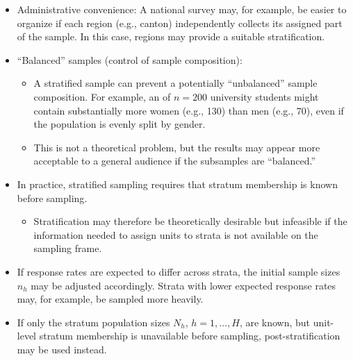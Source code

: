 \documentclass{my_eth_beamer}
\numberwithin{equation}{section}
\begin{document}
\begin{frame}
    \begin{itemize}
    \setlength{\itemsep}{12pt}
        \item \alert{Administrative convenience:} A national survey may, for
            example, be easier to organize if each region (e.g., canton)
            independently collects its assigned part of the sample. In this
            case, regions may provide a suitable stratification.
        \item \alert{``Balanced'' samples (control of sample composition):}
            \begin{itemize}
            \setlength{\itemsep}{6pt}
                \item A stratified sample can prevent a potentially
                    ``unbalanced'' sample composition. For example, an \SRS of
                    $n=200$ university students might contain substantially
                    more women (e.g., 130) than men (e.g., 70), even if the
                    population is evenly split by gender.
                \item This is not a theoretical problem, but the results may
                    appear more acceptable to a general audience if the
                    subsamples are ``balanced.''
        \end{itemize}
    \end{itemize}
\end{frame}


\begin{frame}
    \begin{itemize}
    \setlength{\itemsep}{8pt}
        \item In practice, stratified sampling requires that
            \alert{stratum membership is known before sampling}.
            \vspace{0.25em}
            \begin{itemize}
            \setlength{\itemsep}{4pt}
                \item[\goto] Stratification may therefore be theoretically
                    desirable but infeasible if the information needed to
                    assign units to strata is \alert{not available on the
                    sampling frame}.
            \end{itemize}
        \item If \alert{response rates} are expected to differ across strata,
            the initial sample sizes $n_h$ may be adjusted accordingly. Strata
            with lower expected response rates may, for example, be sampled
            more heavily.
        \item If only the stratum population sizes $N_h$, $h=1,\ldots,H$, are
            known, but unit-level stratum membership is unavailable before
            sampling, \alert{post-stratification} may be used instead.
    \end{itemize}
\end{frame}
\end{document}
